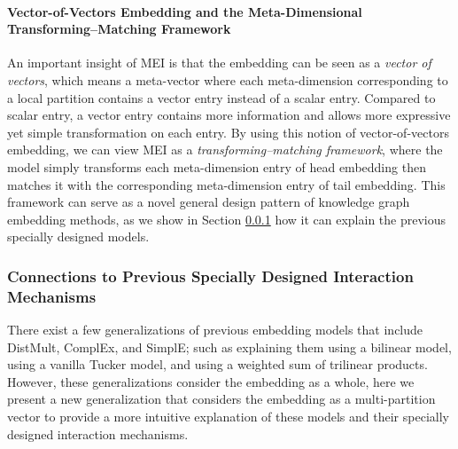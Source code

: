 \documentclass{ecai}
\theoremstyle{plain}  \newtheorem{thm}{Theorem}  \newtheorem{lem}[thm]{Lemma}  \newtheorem{prop}[thm]{Proposition}
\theoremstyle{remark}  \newtheorem*{rem}{Remark}
\begin{document}
\paragraph{Vector-of-Vectors Embedding and the Meta-Dimensional Transforming--Matching Framework}
An important insight of MEI is that the embedding can be seen as a \textit{vector of vectors}, which means a meta-vector where each meta-dimension corresponding to a local partition contains a vector entry instead of a scalar entry. Compared to scalar entry, a vector entry contains more information and allows more expressive yet simple transformation on each entry. By using this notion of vector-of-vectors embedding, we can view MEI as a \textit{transforming--matching framework}, where the model simply transforms each meta-dimension entry of head embedding then matches it with the corresponding meta-dimension entry of tail embedding. This framework can serve as a novel general design pattern of knowledge graph embedding methods, as we show in Section \ref{sect:connection} how it can explain the previous specially designed models.



\subsubsection{Connections to Previous Specially Designed Interaction Mechanisms}\label{sect:connection}


There exist a few generalizations of previous embedding models that include DistMult, ComplEx, and SimplE; such as \cite{kazemi_simpleembeddinglink_2018} explaining them using a bilinear model, \cite{balazevic_tuckertensorfactorization_2019} using a vanilla Tucker model, and \cite{tran_analyzingknowledgegraph_2019} using a weighted sum of trilinear products. However, these generalizations consider the embedding as a whole, here we present a new generalization that considers the embedding as a multi-partition vector to provide a more intuitive explanation of these models and their specially designed interaction mechanisms. 
\end{document}
